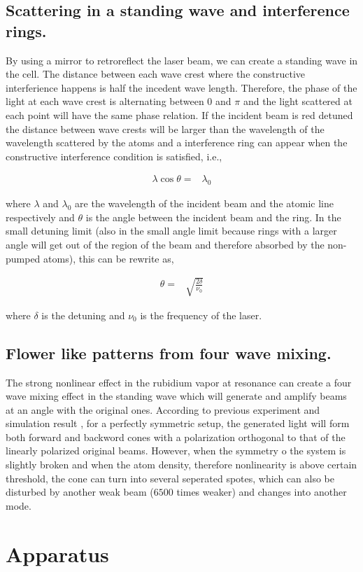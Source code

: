 \documentclass[aps,twocolumn,secnumarabic,balancelastpage,amsmath,amssymb,nofootinbib]{revtex4}
\newcommand{\eqar}[1]
{
  \begin{align*}
    #1
  \end{align*}
}
\begin{document}
\subsection{Scattering in a standing wave and interference rings.}
By using a mirror to retroreflect the laser beam, we can create a standing wave in the cell. The distance between each wave crest where the constructive interferience happens is half the incedent wave length. Therefore, the phase of the light at each wave crest is alternating between $0$ and $\pi$ and the light scattered at each point will have the same phase relation. If the incident beam is red detuned the distance between wave crests will be larger than the wavelength of the wavelength scattered by the atoms and a interference ring can appear when the constructive interference condition is satisfied, i.e.,
\eqar{
  \lambda\cos\theta=&\lambda_0
}
where $\lambda$ and $\lambda_0$ are the wavelength of the incident beam and the atomic line respectively and $\theta$ is the angle between the incident beam and the ring. In the small detuning limit (also in the small angle limit because rings with a larger angle will get out of the region of the beam and therefore absorbed by the non-pumped atoms), this can be rewrite as,
\eqar{
  \theta=&\sqrt{\frac{2\delta}{\nu_0}}
}
where $\delta$ is the detuning and $\nu_0$ is the frequency of the laser.

\subsection{Flower like patterns from four wave mixing.}
The strong nonlinear effect in the rubidium vapor at resonance can create a four wave mixing effect in the standing wave which will generate and amplify beams at an angle with the original ones. According to previous experiment and simulation result \cite{rb_exp, rb_sim, rb_switch}, for a perfectly symmetric setup, the generated light will form both forward and backword cones with a polarization orthogonal to that of the linearly polarized original beams. However, when the symmetry o the system is slightly broken and when the atom density, therefore nonlinearity is above certain threshold, the cone can turn into several seperated spotes, which can also be disturbed by another weak beam ($6500$ times weaker\cite{rb_switch}) and changes into another mode.

\section{Apparatus}
\end{document}
